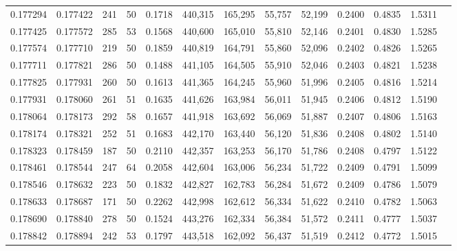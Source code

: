 \begin{tabular}{rrrrrrrrrrrrr}
0.177294 & 0.177422 &   241 &  50 &                                     0.1718 & 440,315 & 165,295 &  55,757 &  52,199 & 0.2400 & 0.4835 & 1.5311 \\
0.177425 & 0.177572 &   285 &  53 &                                     0.1568 & 440,600 & 165,010 &  55,810 &  52,146 & 0.2401 & 0.4830 & 1.5285 \\
0.177574 & 0.177710 &   219 &  50 &                                     0.1859 & 440,819 & 164,791 &  55,860 &  52,096 & 0.2402 & 0.4826 & 1.5265 \\
0.177711 & 0.177821 &   286 &  50 &                                     0.1488 & 441,105 & 164,505 &  55,910 &  52,046 & 0.2403 & 0.4821 & 1.5238 \\
0.177825 & 0.177931 &   260 &  50 &                                     0.1613 & 441,365 & 164,245 &  55,960 &  51,996 & 0.2405 & 0.4816 & 1.5214 \\
0.177931 & 0.178060 &   261 &  51 &                                     0.1635 & 441,626 & 163,984 &  56,011 &  51,945 & 0.2406 & 0.4812 & 1.5190 \\
0.178064 & 0.178173 &   292 &  58 &                                     0.1657 & 441,918 & 163,692 &  56,069 &  51,887 & 0.2407 & 0.4806 & 1.5163 \\
0.178174 & 0.178321 &   252 &  51 &                                     0.1683 & 442,170 & 163,440 &  56,120 &  51,836 & 0.2408 & 0.4802 & 1.5140 \\
0.178323 & 0.178459 &   187 &  50 &                                     0.2110 & 442,357 & 163,253 &  56,170 &  51,786 & 0.2408 & 0.4797 & 1.5122 \\
0.178461 & 0.178544 &   247 &  64 &                                     0.2058 & 442,604 & 163,006 &  56,234 &  51,722 & 0.2409 & 0.4791 & 1.5099 \\
0.178546 & 0.178632 &   223 &  50 &                                     0.1832 & 442,827 & 162,783 &  56,284 &  51,672 & 0.2409 & 0.4786 & 1.5079 \\
0.178633 & 0.178687 &   171 &  50 &                                     0.2262 & 442,998 & 162,612 &  56,334 &  51,622 & 0.2410 & 0.4782 & 1.5063 \\
0.178690 & 0.178840 &   278 &  50 &                                     0.1524 & 443,276 & 162,334 &  56,384 &  51,572 & 0.2411 & 0.4777 & 1.5037 \\
0.178842 & 0.178894 &   242 &  53 &                                     0.1797 & 443,518 & 162,092 &  56,437 &  51,519 & 0.2412 & 0.4772 & 1.5015 \\

\end{tabular}
